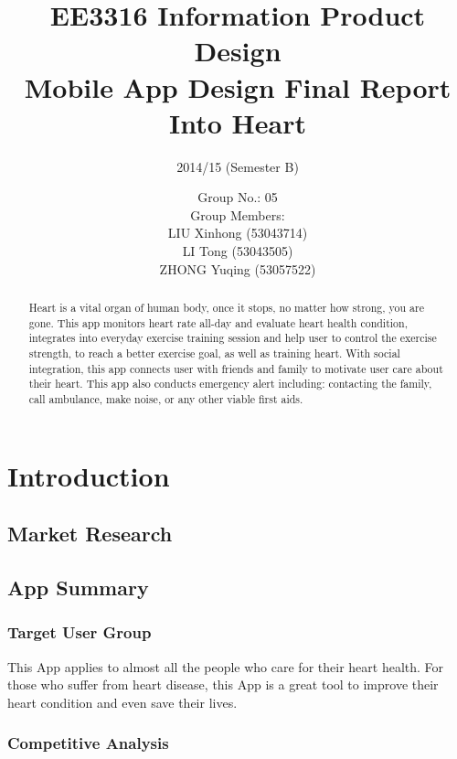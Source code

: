 \documentclass[10pt,a4paper,final,DIV=12]{scrartcl}
\author{
Group No.: 05 \\ 
Group Members: \\
LIU Xinhong (53043714) \\
LI Tong (53043505) \\
ZHONG Yuqing (53057522)
}
\title{
EE3316 Information Product Design \\ Mobile App Design Final Report \\ Into Heart}
\subtitle{2014/15 (Semester B)}
\begin{document}
\maketitle

\pagebreak

\begin{abstract}
Heart is a vital organ of human body, once it stops, no matter how strong, you are gone.  
This app monitors heart rate all-day and evaluate heart health condition, integrates into everyday exercise training session and help user to control the exercise strength, to reach a better exercise goal, as well as training heart. With social integration, this app connects user with friends and family to motivate user care about their heart. This app also conducts emergency alert including: contacting the family, call ambulance, make noise, or any other viable first aids. 
\end{abstract}



\tableofcontents

\section{Introduction}

\subsection{Market Research}


\subsection{App Summary}
\subsubsection{Target User Group}
This App applies to almost all the people who care for their heart health. For those who suffer from heart disease, this App is a great tool to improve their heart condition and even save their lives. 
\subsubsection{Competitive Analysis}

\end{document}
